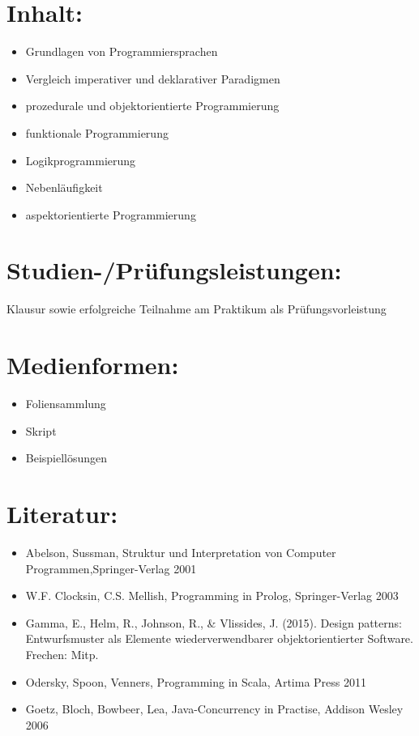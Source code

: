 \section*{Inhalt:}\label{inhalt-17}

\begin{itemize}
\tightlist
\item
  Grundlagen von Programmiersprachen
\item
  Vergleich imperativer und deklarativer Paradigmen
\item
  prozedurale und objektorientierte Programmierung
\item
  funktionale Programmierung
\item
  Logikprogrammierung
\item
  Nebenläufigkeit
\item
  aspektorientierte Programmierung
\end{itemize}

\section*{Studien-/Prüfungsleistungen:}\label{studien-pruxfcfungsleistungen-15}

Klausur sowie erfolgreiche Teilnahme am Praktikum als
Prüfungsvorleistung

\section*{Medienformen:}\label{medienformen-10}

\begin{itemize}
\tightlist
\item
  Foliensammlung
\item
  Skript
\item
  Beispiellösungen
\end{itemize}

\section*{Literatur:}\label{literatur-14}

\begin{itemize}
\tightlist
\item
  Abelson, Sussman, Struktur und Interpretation von Computer
  Programmen,Springer-Verlag 2001
\item
  W.F. Clocksin, C.S. Mellish, Programming in Prolog, Springer-Verlag
  2003
\item
  Gamma, E., Helm, R., Johnson, R., \& Vlissides, J. (2015). Design
  patterns: Entwurfsmuster als Elemente wiederverwendbarer
  objektorientierter Software. Frechen: Mitp.
\item
  Odersky, Spoon, Venners, Programming in Scala, Artima Press 2011
\item
  Goetz, Bloch, Bowbeer, Lea, Java-Concurrency in Practise, Addison
  Wesley 2006
\end{itemize}

